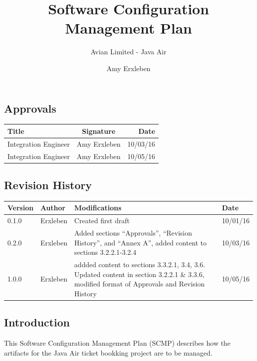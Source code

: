 \documentclass{scrartcl}
\begin{document}
\title{Software Configuration Management Plan}
\subtitle{Avian Limited - Java Air}
\author{Amy Erxleben}

\maketitle
\newpage
\subsection*{Approvals}

\begin{center}
\begin{tabular}{|  l | c | r | }
\hline
  \textbf{Title} & \textbf{Signature} & \textbf{Date} \\ \hline
  Integration Engineer &  \oeschfamily Amy Erxleben & 10/03/16 \\ \hline
  Integration Engineer & \oeschfamily Amy Erxleben & 10/05/16 \\ \hline
\end{tabular}
\end{center}

\subsection*{Revision History}

\begin{center}
\begin{tabular}{| l | l | p{10cm} | l |}
\hline
\textbf{Version} & \textbf{Author} & \textbf{Modifications} & \textbf{Date} \\ \hline
0.1.0 & Erxleben & Created first draft  & 10/01/16 \\ \hline
0.2.0 & Erxleben & Added sections ``Approvals'', ``Revision History'', and ``Annex A'', added content to sections 3.2.2.1-3.2.4 & 10/03/16 \\ \hline
1.0.0 & Erxleben & addded content to sections 3.3.2.1, 3.4, 3.6.  Updated content in section 3.2.2.1 \& 3.3.6, modified format of Approvals and Revision History & 10/05/16 \\ \hline
\end{tabular}
\end{center}
\newpage

\setcounter{secnumdepth}{4}
\setcounter{tocdepth}{4}
\tableofcontents

\newpage
\setcounter{section}{3}
\subsection{Introduction}
This Software Configuration Management Plan (SCMP) describes how the artifacts for the Java Air ticket bookking project are to be managed.
\end{document}
